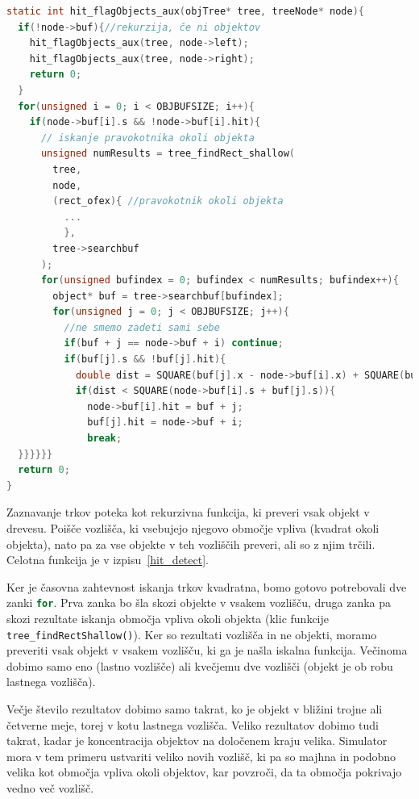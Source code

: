 \documentclass[a4paper,12pt]{article}
\begin{document}
\begin{lstlisting}[float, breaklines=true, postbreak=\mbox{\textcolor{purple}{$\hookrightarrow$}\space}, caption={Zaznava trkov}, label=hit_detect, language=C]
static int hit_flagObjects_aux(objTree* tree, treeNode* node){
  if(!node->buf){//rekurzija, če ni objektov
    hit_flagObjects_aux(tree, node->left);
    hit_flagObjects_aux(tree, node->right);
    return 0;
  }
  for(unsigned i = 0; i < OBJBUFSIZE; i++){
    if(node->buf[i].s && !node->buf[i].hit){      
      // iskanje pravokotnika okoli objekta
      unsigned numResults = tree_findRect_shallow(
        tree,
        node,
        (rect_ofex){ //pravokotnik okoli objekta
          ...
          },
        tree->searchbuf
      );
      for(unsigned bufindex = 0; bufindex < numResults; bufindex++){
        object* buf = tree->searchbuf[bufindex];
        for(unsigned j = 0; j < OBJBUFSIZE; j++){
          //ne smemo zadeti sami sebe
          if(buf + j == node->buf + i) continue; 
          if(buf[j].s && !buf[j].hit){
            double dist = SQUARE(buf[j].x - node->buf[i].x) + SQUARE(buf[j].y - node->buf[i].y);            
            if(dist < SQUARE(node->buf[i].s + buf[j].s)){
              node->buf[i].hit = buf + j;
              buf[j].hit = node->buf + i;
              break;
  }}}}}}
  return 0;
}
\end{lstlisting}

Zaznavanje trkov poteka kot rekurzivna funkcija, ki preveri vsak objekt v drevesu. Poišče vozlišča,
ki vsebujejo njegovo območje vpliva (kvadrat okoli objekta), nato pa za vse objekte v teh vozliščih preveri,
ali so z njim trčili. Celotna funkcija je v izpisu~\ref{hit_detect}.

Ker je časovna zahtevnost iskanja trkov kvadratna, bomo gotovo potrebovali dve zanki \lstinline[language=C]|for|.
Prva zanka bo šla skozi objekte v vsakem vozlišču, druga zanka pa skozi rezultate iskanja območja vpliva okoli
objekta (klic funkcije \lstinline|tree_findRectShallow()|). Ker so rezultati vozlišča in ne objekti, moramo preveriti vsak
objekt v vsakem vozlišču, ki ga je našla iskalna funkcija. Večinoma dobimo samo eno (lastno vozlišče) ali kvečjemu dve
vozlišči (objekt je ob robu lastnega vozlišča).

Večje število rezultatov dobimo samo takrat, ko je objekt v bližini trojne ali četverne meje,
torej v kotu lastnega vozlišča. Veliko rezultatov dobimo tudi takrat, kadar je koncentracija 
objektov na določenem kraju velika. Simulator mora v tem primeru ustvariti veliko novih vozlišč, ki pa so 
majhna in podobno velika kot območja vpliva okoli objektov, kar povzroči, da ta območja pokrivajo vedno več vozlišč.
\end{document}
